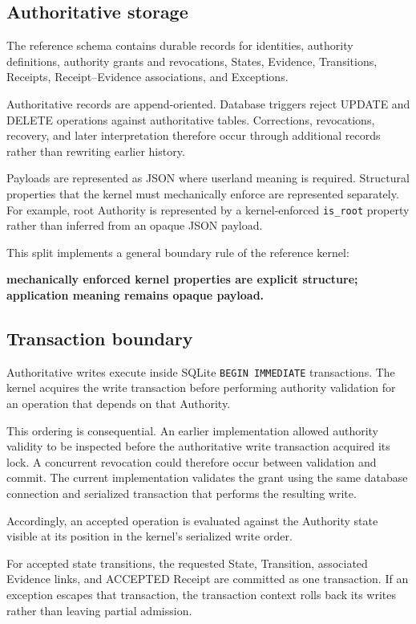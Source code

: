 \documentclass[11pt]{article}
\begin{document}
\subsection{Authoritative storage}

The reference schema contains durable records for identities, authority definitions, authority grants and revocations, States, Evidence, Transitions, Receipts, Receipt--Evidence associations, and Exceptions.

Authoritative records are append-oriented. Database triggers reject UPDATE and DELETE operations against authoritative tables. Corrections, revocations, recovery, and later interpretation therefore occur through additional records rather than rewriting earlier history.

Payloads are represented as JSON where userland meaning is required. Structural properties that the kernel must mechanically enforce are represented separately. For example, root Authority is represented by a kernel-enforced \texttt{is\_root} property rather than inferred from an opaque JSON payload.

This split implements a general boundary rule of the reference kernel:

\textbf{mechanically enforced kernel properties are explicit structure; application meaning remains opaque payload.}

\subsection{Transaction boundary}

Authoritative writes execute inside SQLite \texttt{BEGIN IMMEDIATE} transactions. The kernel acquires the write transaction before performing authority validation for an operation that depends on that Authority.

This ordering is consequential. An earlier implementation allowed authority validity to be inspected before the authoritative write transaction acquired its lock. A concurrent revocation could therefore occur between validation and commit. The current implementation validates the grant using the same database connection and serialized transaction that performs the resulting write.

Accordingly, an accepted operation is evaluated against the Authority state visible at its position in the kernel's serialized write order.

For accepted state transitions, the requested State, Transition, associated Evidence links, and ACCEPTED Receipt are committed as one transaction. If an exception escapes that transaction, the transaction context rolls back its writes rather than leaving partial admission.
\end{document}
